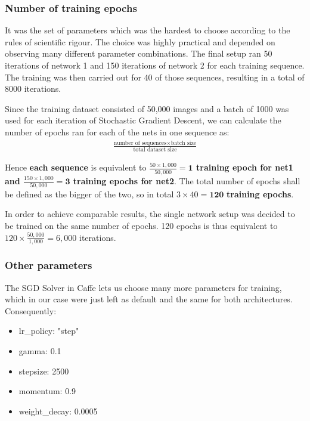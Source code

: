 \documentclass[a4paper, 12pt]{article}
\numberwithin{equation}{section}
\begin{document}
	\subsubsection{Number of training epochs}

	It was the set of parameters which was the hardest to choose according to the rules of scientific rigour. The choice was highly practical and depended on observing many different parameter combinations. The final setup ran 50 iterations of network 1 and 150 iterations of network 2 for each training sequence. The training was then carried out for 40 of those sequences, resulting in a total of 8000 iterations.

	Since the training dataset consisted of 50,000 images and a batch of 1000 was used for each iteration of Stochastic Gradient Descent, we can calculate the number of epochs ran for each of the nets in one sequence as:
	\begin{align}
		\frac{\text{number of sequences} \times \text{batch size}}{\text{total dataset size}}
	\end{align}

	Hence \textbf{each sequence} is equivalent to \textbf{$\frac{50\times1,000}{50,000}=\boldsymbol1$ training epoch for net1 and $\frac{150\times1,000}{50,000}=\boldsymbol3$ training epochs for net2}. The total number of epochs shall be defined as the bigger of the two, so in total $3\times40=\boldsymbol{120}$ \textbf{training epochs}.

	In order to achieve comparable results, the single network setup was decided to be trained on the same number of epochs. 120 epochs is thus equivalent to $120\times\frac{50,000}{1,000}=6,000$ iterations.

	\subsubsection{Other parameters}

	The SGD Solver in Caffe lets us choose many more parameters for training, which in our case were just left as default and the same for both architectures. Consequently:
	\begin{itemize}
		\item lr\_policy: "step"
		\item gamma: 0.1
		\item stepsize: 2500
		\item momentum: 0.9
		\item weight\_decay: 0.0005
	\end{itemize}
\end{document}

